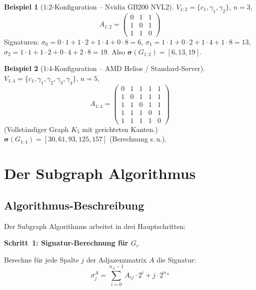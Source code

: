 ﻿\documentclass[a4paper,12pt]{article}
\theoremstyle{definition}
\newtheorem{beispiel}{Beispiel}
\begin{document}
\begin{beispiel}[1:2-Konfiguration -- Nvidia GB200 NVL2]
  \label{ex:12}
  $V_{1:2} = \{c_1, \gamma_1, \gamma_2\}$, $n = 3$,
  \[
    A_{1:2} = \begin{pmatrix}
      0 & 1 & 1 \\
      1 & 0 & 1 \\
      1 & 1 & 0
    \end{pmatrix}
  \]
  Signaturen:
  $\sigma_0 = 0\cdot1 + 1\cdot2 + 1\cdot4 + 0\cdot8 = 6$,
  $\sigma_1 = 1\cdot1 + 0\cdot2 + 1\cdot4 + 1\cdot8 = 13$,
  $\sigma_2 = 1\cdot1 + 1\cdot2 + 0\cdot4 + 2\cdot8 = 19$.
  Also $\boldsymbol{\sigma}(G_{1:2}) = [6, 13, 19]$.
\end{beispiel}

\begin{beispiel}[1:4-Konfiguration -- AMD Helios / Standard-Server]
  \label{ex:14}
  $V_{1:4} = \{c_1, \gamma_1, \gamma_2, \gamma_3, \gamma_4\}$, $n = 5$,
  \[
    A_{1:4} = \begin{pmatrix}
      0 & 1 & 1 & 1 & 1 \\
      1 & 0 & 1 & 1 & 1 \\
      1 & 1 & 0 & 1 & 1 \\
      1 & 1 & 1 & 0 & 1 \\
      1 & 1 & 1 & 1 & 0
    \end{pmatrix}
  \]
  (Vollst\"andiger Graph $K_5$ mit gerichteten Kanten.)
  $\boldsymbol{\sigma}(G_{1:4}) = [30, 61, 93, 125, 157]$ (Berechnung s.\,u.).
\end{beispiel}

\section{Der Subgraph Algorithmus}

\subsection{Algorithmus-Beschreibung}

Der Subgraph Algorithmus \cite{epp2026subgraph} arbeitet in drei Hauptschritten:

\textbf{Schritt~1: Signatur-Berechnung f\"ur $G_r$}

Berechne f\"ur jede Spalte $j$ der Adjazenzmatrix $A$ die Signatur:
\[
  \sigma_j^A = \sum_{i=0}^{n_A-1} A_{ij} \cdot 2^i + j \cdot 2^{n_A}
\]
\end{document}
